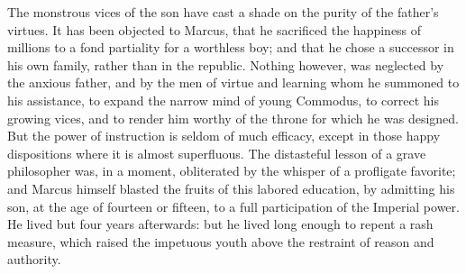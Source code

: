 



The monstrous vices of the son have cast a shade on the purity of
the father’s virtues. It has been objected to Marcus, that he
sacrificed the happiness of millions to a fond partiality for a
worthless boy; and that he chose a successor in his own family,
rather than in the republic. Nothing however, was neglected by
the anxious father, and by the men of virtue and learning whom he
summoned to his assistance, to expand the narrow mind of young
Commodus, to correct his growing vices, and to render him worthy
of the throne for which he was designed. But the power of
instruction is seldom of much efficacy, except in those happy
dispositions where it is almost superfluous. The distasteful
lesson of a grave philosopher was, in a moment, obliterated by
the whisper of a profligate favorite; and Marcus himself blasted
the fruits of this labored education, by admitting his son, at
the age of fourteen or fifteen, to a full participation of the
Imperial power. He lived but four years afterwards: but he lived
long enough to repent a rash measure, which raised the impetuous
youth above the restraint of reason and authority.


